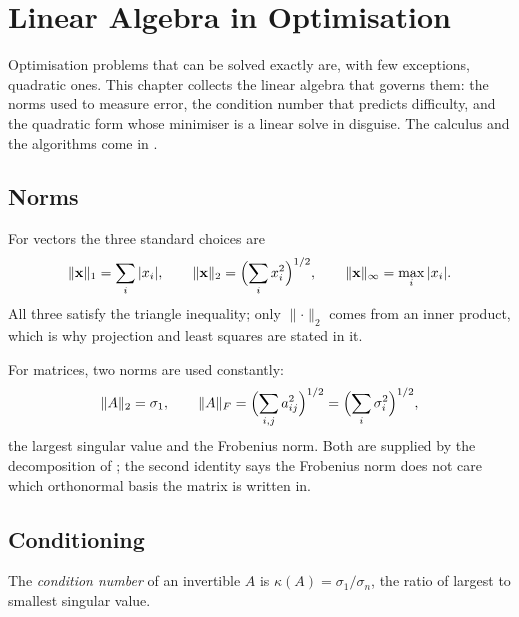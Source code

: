 \setchapterpreamble[u]{\margintoc}
\chapter{Linear Algebra in Optimisation}


Optimisation problems that can be solved exactly are, with few exceptions,
quadratic ones. This chapter collects the linear algebra that governs them: the
norms used to measure error, the condition number that predicts difficulty, and
the quadratic form whose minimiser is a linear solve in disguise. The calculus
and the algorithms come in .

\section{Norms}

For vectors the three standard choices are
\[
	\lVert\mathbf{x}\rVert_1=\sum_i|x_i|,
	\qquad
	\lVert\mathbf{x}\rVert_2=\Bigl(\sum_i x_i^{2}\Bigr)^{1/2},
	\qquad
	\lVert\mathbf{x}\rVert_\infty=\max_i|x_i| .
\]
All three satisfy the triangle inequality; only \(\lVert\cdot\rVert_2\) comes
from an inner product, which is why projection and least squares are stated in
it.


For matrices, two norms are used constantly:
\[
	\lVert A\rVert_2=\sigma_1,
	\qquad
	\lVert A\rVert_F=\Bigl(\sum_{i,j}a_{ij}^{2}\Bigr)^{1/2}
	=\Bigl(\sum_i\sigma_i^{2}\Bigr)^{1/2},
\]
the largest singular value and the Frobenius norm. Both are supplied by the
decomposition of ; the second identity says the Frobenius norm does
not care which orthonormal basis the matrix is written in.

\section{Conditioning}

\begin{definition}
The \emph{condition number} of an invertible \(A\) is
\(\kappa(A)=\sigma_1/\sigma_n\), the ratio of largest to smallest singular value.
\end{definition}

